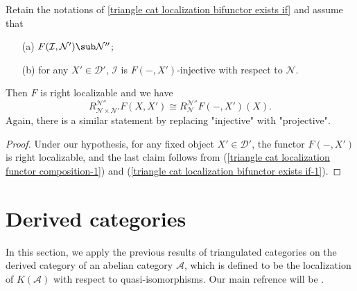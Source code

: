 \begin{corollary}\label{triangle cat localization bifunctor if exact one variable}
Retain the notations of \cref{triangle cat localization bifunctor exists if} and assume that
\begin{enumerate}
    \item[(a)] $F(\mathcal{I},\mathcal{N}')\sub\mathcal{N}''$;
    \item[(b)] for any $X'\in\mathcal{D}'$, $\mathcal{I}$ is $F(-,X')$-injective with respect to $\mathcal{N}$.
\end{enumerate}
Then $F$ is right localizable and we have
\[R_{\mathcal{N}\times\mathcal{N}'}^{\mathcal{N}''}F(X,X')\cong R_{\mathcal{N}}^{\mathcal{N}''}F(-,X')(X).\]
Again, there is a similar statement by replacing "injective" with "projective".
\end{corollary}
\begin{proof}
Under our hypothesis, for any fixed object $X'\in\mathcal{D}'$, the functor $F(-,X')$ is right localizable, and the last claim follows from (\ref{triangle cat localization functor composition-1}) and (\ref{triangle cat localization bifunctor exists if-1}).
\end{proof}

\section{Derived categories}
In this section, we apply the previous results of triangulated categories on the derived category of an abelian category $\mathcal{A}$, which is defined to be the localization of $K(\mathcal{A})$ with respect to quasi-isomorphisms. Our main refrence will be \cite{kashiwara_SAC}.
